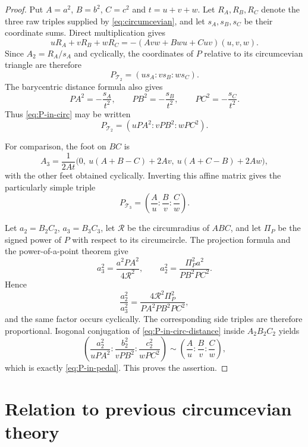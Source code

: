 \documentclass[11pt]{article}
\newcommand{\Circ}{\mathcal T_2}
\newcommand{\Ped}{\mathcal T_3}
\begin{document}
\begin{proof}
Put $A=a^2$, $B=b^2$, $C=c^2$ and $t=u+v+w$.  Let $R_A,R_B,R_C$ denote
the three raw triples supplied by \eqref{eq:circumcevian}, and let
$s_A,s_B,s_C$ be their coordinate sums.  Direct multiplication gives
\[
 uR_A+vR_B+wR_C
 =-(Avw+Bwu+Cuv)(u,v,w).
\]
Since $A_2=R_A/s_A$ and cyclically, the coordinates of $P$ relative to its
circumcevian triangle are therefore
\begin{equation}\label{eq:P-in-circ}
 P_{\Circ}=(us_A:vs_B:ws_C).
\end{equation}
The barycentric distance formula also gives
\[
 PA^2=-\frac{s_A}{t^2},\qquad
 PB^2=-\frac{s_B}{t^2},\qquad
 PC^2=-\frac{s_C}{t^2}.
\]
Thus \eqref{eq:P-in-circ} may be written
\begin{equation}\label{eq:P-in-circ-distance}
 P_{\Circ}=(uPA^2:vPB^2:wPC^2).
\end{equation}

For comparison, the foot on $BC$ is
\[
 A_3=\frac{1}{2At}
 \bigl(0,\ u(A+B-C)+2Av,\ u(A+C-B)+2Aw\bigr),
\]
with the other feet obtained cyclically.  Inverting this affine matrix gives
the particularly simple triple
\begin{equation}\label{eq:P-in-pedal}
 P_{\Ped}=\left(\frac A u:\frac B v:\frac C w\right).
\end{equation}

Let $a_2=B_2C_2$, $a_3=B_3C_3$, let $\mathcal R$ be the circumradius of
$ABC$, and let $\Pi_P$ be the signed power of $P$ with respect to its
circumcircle.  The projection formula and the power-of-a-point theorem give
\[
 a_3^2=\frac{a^2PA^2}{4\mathcal R^2},
 \qquad
 a_2^2=\frac{\Pi_P^2a^2}{PB^2PC^2}.
\]
Hence
\[
 \frac{a_2^2}{a_3^2}
 =\frac{4\mathcal R^2\Pi_P^2}{PA^2PB^2PC^2},
\]
and the same factor occurs cyclically.  The corresponding side triples are
therefore proportional.  Isogonal conjugation of
\eqref{eq:P-in-circ-distance} inside $A_2B_2C_2$ yields
\[
 \left(\frac{a_2^2}{uPA^2}:
       \frac{b_2^2}{vPB^2}:
       \frac{c_2^2}{wPC^2}\right)
 \sim\left(\frac A u:\frac B v:\frac C w\right),
\]
which is exactly \eqref{eq:P-in-pedal}.  This proves the assertion.
\end{proof}

\section{Relation to previous circumcevian theory}
\label{sec:previous-theory}
\end{document}
